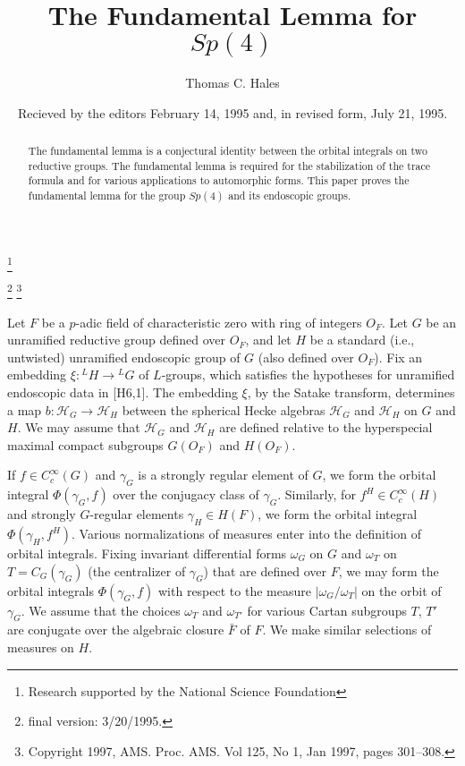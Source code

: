 \documentclass{amsart}
\newcommand\cH{{\mathcal H}}
\begin{document}
\title{The Fundamental Lemma for $Sp(4)$}
\author{Thomas C. Hales}
\address{Ann Arbor, Michigan}
\thanks{Research supported by the National Science Foundation}
\date{Recieved by the editors February 14, 1995 and, in revised form,
  July 21, 1995.}
\thanks{final version: 3/20/1995.}
\thanks{Copyright 1997, AMS.
  Proc. AMS. Vol 125, No 1, Jan 1997, pages 301--308.}


\begin{abstract}
The fundamental lemma is a conjectural identity between the orbital
integrals on two reductive groups.  The fundamental lemma is required
for the stabilization of the trace formula and for various
applications to automorphic forms.  This paper proves the fundamental
lemma for the group $Sp(4)$ and its endoscopic groups.
\end{abstract}


\maketitle

Let $F$ be a $p$-adic field of characteristic zero with ring of
integers $O_F$.  Let $G$ be an unramified reductive group defined over
$O_F$, and let $H$ be a standard (i.e., untwisted) unramified
endoscopic group of $G$ (also defined over $O_F$).  Fix an embedding
$\xi: {}^LH\to {}^LG$ of $L$-groups, which satisfies the hypotheses
for unramified endoscopic data in [H6,1].  The embedding $\xi$, by the
Satake transform, determines a map $b: \cH_G \to \cH_H$ between the
spherical Hecke algebras $\cH_G$ and $\cH_H$ on $G$ and $H$.  We may
assume that $\cH_G$ and $\cH_H$ are defined relative to the
hyperspecial maximal compact subgroups $G(O_F)$ and $H(O_F)$.

If $f\in C_c^\infty(G)$ and $\gamma_G$ is a strongly regular element
of $G$, we form the orbital integral $\Phi(\gamma_G,f)$ over the
conjugacy class of $\gamma_G$.  Similarly, for $f^H\in C_c^\infty(H)$
and strongly $G$-regular elements $\gamma_H\in H(F)$, we form the
orbital integral $\Phi(\gamma_H,f^H)$.  Various normalizations of
measures enter into the definition of orbital integrals.  Fixing
invariant differential forms $\omega_G$ on $G$ and $\omega_T$ on
$T=C_G(\gamma_G)$ (the centralizer of $\gamma_G$) that are defined
over $F$, we may form the orbital integrals $\Phi(\gamma_G,f)$ with
respect to the measure $|\omega_G/\omega_T|$ on the orbit of
$\gamma_G$.  We assume that the choices $\omega_T$ and $\omega_{T'}$
for various Cartan subgroups $T$, $T'$ are conjugate over the
algebraic closure $\bar F$ of $F$.  We make similar selections of
measures on $H$.
\end{document}
